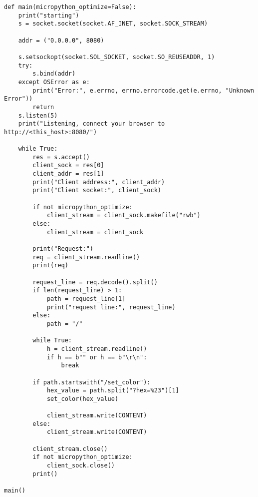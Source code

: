 \documentclass[twoside, 12pt]{article}
\begin{document}
\begin{lstlisting}[caption={HTTP server implementation with MicroPython for MicroPython's Zehpyr port runing on FRDM-MCXN947 board},breaklines=true]
def main(micropython_optimize=False):
    print("starting")
    s = socket.socket(socket.AF_INET, socket.SOCK_STREAM)
    
    addr = ("0.0.0.0", 8080)

    s.setsockopt(socket.SOL_SOCKET, socket.SO_REUSEADDR, 1)
    try:
        s.bind(addr)
    except OSError as e:
        print("Error:", e.errno, errno.errorcode.get(e.errno, "Unknown Error"))
        return
    s.listen(5)
    print("Listening, connect your browser to http://<this_host>:8080/")

    while True:
        res = s.accept()
        client_sock = res[0]
        client_addr = res[1]
        print("Client address:", client_addr)
        print("Client socket:", client_sock)

        if not micropython_optimize:
            client_stream = client_sock.makefile("rwb")
        else:
            client_stream = client_sock

        print("Request:")
        req = client_stream.readline()
        print(req)

        request_line = req.decode().split()
        if len(request_line) > 1:
            path = request_line[1]
            print("request line:", request_line)
        else:
            path = "/"

        while True:
            h = client_stream.readline()
            if h == b"" or h == b"\r\n":
                break
        
        if path.startswith("/set_color"):
            hex_value = path.split("?hex=%23")[1]
            set_color(hex_value)

            client_stream.write(CONTENT)
        else:
            client_stream.write(CONTENT)

        client_stream.close()
        if not micropython_optimize:
            client_sock.close()
        print()

main()
\end{lstlisting}
\end{document}
